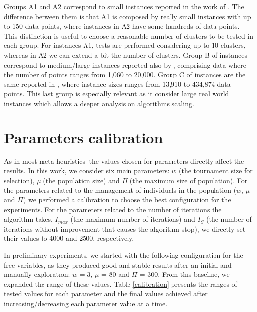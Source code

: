 Groups A1 and A2 correspond to small instances reported in the work of \cite{Ordin2014}. The difference between them is that A1 is composed by really small instances with up to 150 data points, where instances in A2 have some hundreds of data points. This distinction is useful to choose a reasonable number of clusters to be tested in each group. For instances A1, tests are performed considering up to 10 clusters, whereas in A2 we can extend a bit the number of clusters. Group B of instances correspond to medium/large instances reported also by \cite{Ordin2014}, comprising data where the number of points ranges from 1,060 to 20,000. Group C of instances are the same reported in \cite{Bagirov2016}, where instance sizes ranges from 13,910 to 434,874 data points. This last group is especially relevant as it consider large real world instances which allows a deeper analysis on algorithms scaling.

\section{Parameters calibration}
\label{sec:calibration}
As in most meta-heuristics, the values chosen for parameters directly affect the results. In this work, we consider six main parameters: $w$ (the tournament size for selection), $\mu$ (the population size) and $\Pi$ (the maximum size of population). For the parameters related to the management of individuals in the population ($w$, $\mu$ and $\Pi$) we performed a calibration to choose the best configuration for the experiments. For the parameters related to the number of iterations the algorithm takes, $I_{max}$ (the maximum number of iterations) and $I_S$ (the number of iterations without improvement that causes the algorithm stop), we directly set their values to 4000 and 2500, respectively.

In preliminary experiments, we started with the following configuration for the free variables, as they produced good and stable results after an initial and manually exploration: $w$ = 3, $\mu$ = 80 and $\Pi$ = 300. From this baseline, we expanded the range of these values. Table \ref{calibration} presents the ranges of tested values for each parameter and the final values achieved after increasing/decreasing each parameter value at a time.




